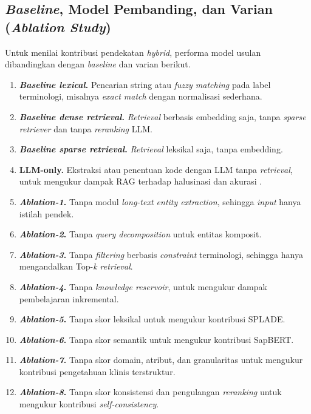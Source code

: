 \subsection{\textit{Baseline}, Model Pembanding, dan Varian (\textit{Ablation Study})}

Untuk menilai kontribusi pendekatan \textit{hybrid}, performa model usulan dibandingkan dengan \textit{baseline} dan varian berikut.

\begin{enumerate}
    \item \textbf{\textit{Baseline lexical}.} Pencarian string atau \textit{fuzzy matching} pada label terminologi, misalnya \textit{exact match} dengan normalisasi sederhana.
    \item \textbf{\textit{Baseline dense retrieval}.} \textit{Retrieval} berbasis embedding saja, tanpa \textit{sparse retriever} dan tanpa \textit{reranking} LLM.
    \item \textbf{\textit{Baseline sparse retrieval}.} \textit{Retrieval} leksikal saja, tanpa embedding.
    \item \textbf{LLM-only.} Ekstraksi atau penentuan kode dengan LLM tanpa \textit{retrieval}, untuk mengukur dampak RAG terhadap halusinasi dan akurasi \citep{gilani_cde-mapper_2025,yu_large_2026}.
    \item \textbf{\textit{Ablation-1}.} Tanpa modul \textit{long-text entity extraction}, sehingga \textit{input} hanya istilah pendek.
    \item \textbf{\textit{Ablation-2}.} Tanpa \textit{query decomposition} untuk entitas komposit.
    \item \textbf{\textit{Ablation-3}.} Tanpa \textit{filtering} berbasis \textit{constraint} terminologi, sehingga hanya mengandalkan Top-\textit{k retrieval}.
    \item \textbf{\textit{Ablation-4}.} Tanpa \textit{knowledge reservoir}, untuk mengukur dampak pembelajaran inkremental.
    \item \textbf{\textit{Ablation-5}.} Tanpa skor leksikal untuk mengukur kontribusi SPLADE.
    \item \textbf{\textit{Ablation-6}.} Tanpa skor semantik untuk mengukur kontribusi SapBERT.
    \item \textbf{\textit{Ablation-7}.} Tanpa skor domain, atribut, dan granularitas untuk mengukur kontribusi pengetahuan klinis terstruktur.
    \item \textbf{\textit{Ablation-8}.} Tanpa skor konsistensi dan pengulangan \textit{reranking} untuk mengukur kontribusi \textit{self-consistency}.
\end{enumerate}

